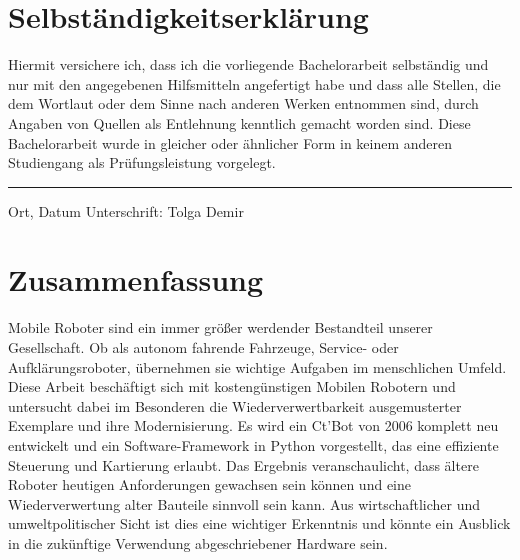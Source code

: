 \documentclass[twoside,11pt, a4paper]{report}
\begin{document}
	\thispagestyle{empty}
	
	\section*{Selbst\"andigkeitserkl\"arung}
	
	Hiermit versichere ich, dass ich die vorliegende Bachelorarbeit 
	selbst\"andig und nur mit den angegebenen Hilfsmitteln angefertigt habe und dass alle Stellen, die dem Wortlaut oder dem 
	Sinne nach anderen Werken entnommen sind, durch Angaben von Quellen als 
	Entlehnung kenntlich gemacht worden sind. 
	Diese Bachelorarbeit wurde in gleicher oder \"ahnlicher Form in keinem anderen 
	Studiengang als Pr\"ufungsleistung vorgelegt. 
	
	\vskip 3cm
	\hrule
	\vspace*{2ex}
	
	Ort, Datum	\hfill Unterschrift: Tolga Demir \hfill 
	\newpage
	
	
	\setcounter{page}{1}
	
	
	
	\section*{Zusammenfassung}
	
	 Mobile Roboter sind ein immer größer werdender Bestandteil unserer Gesellschaft. Ob als autonom fahrende Fahrzeuge, Service- oder Aufklärungsroboter, übernehmen sie wichtige Aufgaben im menschlichen Umfeld. Diese Arbeit beschäftigt sich mit kostengünstigen Mobilen Robotern und untersucht dabei im Besonderen die Wiederverwertbarkeit ausgemusterter Exemplare und ihre Modernisierung. Es wird ein Ct'Bot von 2006 komplett neu entwickelt und ein Software-Framework in Python vorgestellt, das eine effiziente Steuerung und Kartierung erlaubt. Das Ergebnis veranschaulicht, dass ältere Roboter heutigen Anforderungen gewachsen sein können und eine Wiederverwertung alter Bauteile sinnvoll sein kann. Aus wirtschaftlicher und umweltpolitischer Sicht ist dies eine wichtiger Erkenntnis und könnte ein Ausblick in die zukünftige Verwendung abgeschriebener Hardware sein. 
\end{document}
